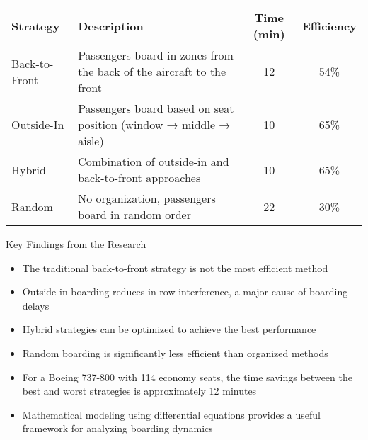 \documentclass{article}
\begin{document}
\begin{tabular}{|l|p{8cm}|c|c|}
  \hline
  \textbf{Strategy} & \textbf{Description} & \textbf{Time (min)} & \textbf{Efficiency} \\
  \hline
  Back-to-Front & Passengers board in zones from the back of the aircraft to the front & 12 & 54\% \\
  \hline
  Outside-In & Passengers board based on seat position (window → middle → aisle) & 10 & 65\% \\
  \hline
  Hybrid & Combination of outside-in and back-to-front approaches & 10 & 65\% \\
  \hline
  Random & No organization, passengers board in random order & 22 & 30\% \\
  \hline
\end{tabular}

\begin{center}
  \Large Key Findings from the Research
\end{center}

\begin{itemize}
  \item The traditional back-to-front strategy is not the most efficient method
  \item Outside-in boarding reduces in-row interference, a major cause of boarding delays
  \item Hybrid strategies can be optimized to achieve the best performance
  \item Random boarding is significantly less efficient than organized methods
  \item For a Boeing 737-800 with 114 economy seats, the time savings between the best and worst strategies is approximately 12 minutes
  \item Mathematical modeling using differential equations provides a useful framework for analyzing boarding dynamics
\end{itemize}
\end{document}
